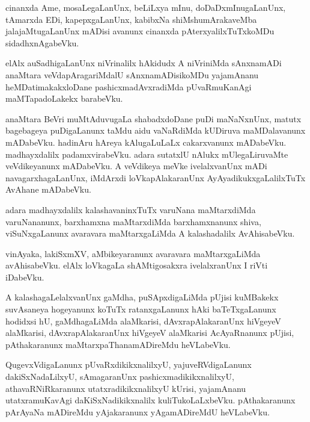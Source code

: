 \documentclass{article}
\begin{document}
\begin{mn}
cinanxda  Ame,  mosaLegaLanUnx,  beLiLxya  mInu,  doDaDxmInugaLanUnx,  tAmarxda  EDi,  
kapepxgaLanUnx,  kabibxNa  shiMshumArakaveMba  jalajaMtugaLanUnx    mADisi  avanunx  
cinanxda  pAterxyalilxTuTxkoMDu  sidadhxnAgabeVku.
\end{mn}

\begin{mn}
elAlx  auSadhigaLanUnx  niVrinalilx  hAkidudx  A  niVriniMda  sAnxnamADi  anaMtara  veVdapAragariMdalU  
sAnxnamADisikoMDu  yajamAnanu  heMDatimakakxloDane  pashicxmadAvxradiMda  pUvaRmuKanAgi  maMTapadoLakekx  barabeVku.
\end{mn}

\begin{mn}
anaMtara  BeVri  muMtAduvugaLa  shabadxdoDane  puDi  maNaNxnUnx,  matutx  bagebageya  puDigaLanunx  
taMdu  aidu  vaNaRdiMda  kUDiruva  maMDalavanunx  mADabeVku.  hadinAru  hAreya  kAlugaLuLaLx  cakarxvanunx  
mADabeVku.  madhayxdalilx  padamxvirabeVku.  adara  sutatxlU  nAlukx  mUlegaLiruvaMte  veVdikeyanunx  
mADabeVku.  A  veVdikeya  meVke  ivelalxvanUnx  mADi  navagarxhagaLanUnx,  iMdArxdi  loVkapAlakaranUnx  
AyAyadikukxgaLalilxTuTx  AvAhane  mADabeVku.
\end{mn}

\begin{mn}
adara  madhayxdalilx  kalashavaninxTuTx  varuNana  maMtarxdiMda  varuNananunx,  barxhamxna  maMtarxdiMda  
barxhamxnanunx  shiva,  viSuNxgaLanunx  avaravara  maMtarxgaLiMda  A  kalashadalilx  AvAhisabeVku.
\end{mn}

\begin{mn}
vinAyaka,  lakiSxmXV,  aMbikeyaranunx  avaravara  maMtarxgaLiMda  avAhisabeVku.  elAlx  loVkagaLa  
shAMtigosakxra  ivelalxranUnx  I riVti  iDabeVku.
\end{mn}

\begin{mn}
A  kalashagaLelalxvanUnx  gaMdha,  puSApxdigaLiMda  pUjisi  kuMBakekx  suvAsaneya  hogeyanunx  
koTuTx  ratanxgaLanunx  hAki  baTeTxgaLanunx  hodidxsi  hU,  gaMdhagaLiMda  alaMkarisi,  
dAvxrapAlakaranUnx  hiVgeyeV  alaMkarisi,  dAvxrapAlakaranUnx  hiVgeyeV  alaMkarisi  AcAyaRnanunx  
pUjisi,  pAthakaranunx  maMtarxpaThanamADireMdu  heVLabeVku.  
\end{mn}

\begin{mn}
QugevxVdigaLanunx  pUvaRxdikikxnalilxyU,  yajuveRVdigaLanunx  dakiSxNadaLilxyU,  sAmagaranUnx  
pashicxmadikikxnalilxyU,  athavaRNiRkaranunx  utatxradikikxnalilxyU  kUrisi,  yajamAnanu  
utatxramuKavAgi  daKiSxNadikikxnalilx  kuliTukoLaLxbeVku.  pAthakaranunx  pArAyaNa  mADireMdu  
yAjakaranunx  yAgamADireMdU  heVLabeVku.
\end{mn}
\end{document}
